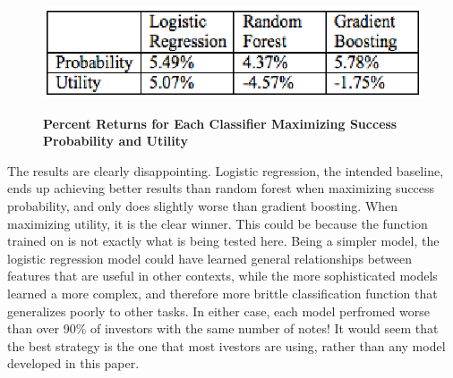 \begin{figure}[!h]
    \centering
    \includegraphics[scale=0.5]{figs/returns.eps}
    \label{table:returns}
    \caption{\textbf{Percent Returns for Each Classifier Maximizing Success Probability and Utility}}
\end{figure}

The results are clearly disappointing. Logistic regression, the intended baseline, ends up achieving better results than 
random forest when maximizing success probability, and only does slightly worse than gradient boosting. When maximizing 
utility, it is the clear winner. This could be because the function trained on is not exactly what is being tested here. 
Being a simpler model, the logistic regression model could have learned general relationships between features that are 
useful in other contexts, while the more sophisticated models learned a more complex, and therefore more brittle classification 
function that generalizes poorly to other tasks. In either case, each model perfromed worse than over 90\% of investors 
with the same number of notes! It would seem that the best strategy is the one that most ivestors are using, rather than 
any model developed in this paper.
